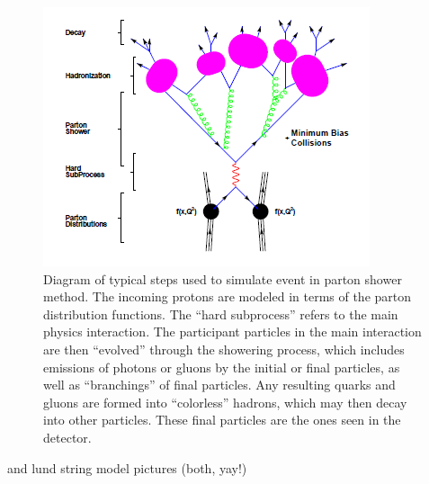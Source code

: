  \begin{figure}[htb]
  \begin{center}
    \includegraphics{Figures/mc-partonShower-lesHouches.png}
  \end{center}
  \caption[Diagram of typical steps used to simulate event in parton shower method]
	  {Diagram of typical steps used to simulate event in parton shower method.
	    The incoming protons are modeled in terms of the 
	    parton distribution functions. 
	    The ``hard subprocess'' refers to the main 
	    physics interaction.  
	    The participant particles in the main interaction 
	    are then ``evolved'' through the showering process, 
	    which includes emissions of photons or gluons 
	    by the initial or final particles, 
	    as well as ``branchings'' of final particles. %
	    Any resulting quarks and gluons are 
	    formed into ``colorless'' hadrons, 
	    which may then decay into other particles. 
	    These final particles are the ones seen 
	    in the detector.  
	  }
  \label{fig:MCsteps}
 \end{figure}


and lund string model pictures (both, yay!)


